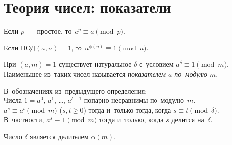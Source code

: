\section*{Теория чисел: показатели}



\begingroup\providecommand\ifincludesolutions{\iffalse}

\ifincludesolutions
\subsection*{Версия с решениями}
\fi

Если $p$~— простое, то~$a^p \equiv a \pmod{p}$.

Если $\text{НОД}(a, n) = 1$, то~$a^{\mathrm{\phi}(n)} \equiv 1 \pmod{n}$.

При $(a, m) = 1$ существует натуральное $\delta$ с~условием
$a^{\delta} \equiv 1 \pmod{m}$.
Наименьшее из~таких чисел называется \emph{показателем $a$ по~модулю $m$}.

\begin{problems}

\item
В~обозначениях из~предыдущего определения:
\\
\subproblem
Числа $1 = a^0$, $a^1$, \ldots, $a^{\delta-1}$ попарно несравнимы
по~модулю~$m$.
\\
\subproblem
$a^s \equiv a^t \pmod{m}$ ($s, t \geq 0$)
тогда и~только тогда, когда
$s \equiv t \pmod{\delta}$.
В~частности, $a^s \equiv 1 \pmod{m}$
тогда и~только, когда
$s$ делится на~$\delta$.
\\
\subproblem
\ifincludesolutions\label{extra/algebra:phi:problem}\fi
Число $\delta$ является делителем $\mathrm{\phi}(m)$.

\end{problems}

\ifincludesolutions
\setcounter{jeolmsubproblem}{0}%
\subproblem
Пусть $a^s \equiv a^t \pmod{m}$.
Тогда $a^{t} (a^{s-t} - 1)$ делится на~$m$.
То есть $(a^{s-t} - 1)$ делится на~$m$.
Но~такого быть не~может, поскольку $0 < s - t < \delta$.
\par
\subproblem
Сначала докажем, что $a^s \equiv 1 \pmod{m}$ тогда и только тогда, когда
$s$ делится на~$\delta$.
Пусть это не~так.
Тогда $s = x \delta + r$.
Имеем, $1 \equiv a^s \equiv (a^{\delta})^x a^r \equiv a^r \pmod{m}$.
Но~такого быть не~может из~определения показателя.
Значит, $r = 0$ и~$s$ делится на~$\delta$ без остатка.
Отсюда сразу следует, что если $a^s \equiv a^t \pmod{m}$, то~$(a^{s-t} - 1)$
делится на~$m$, то~есть $(s - t)$ делится на~$\delta$.
\par
\subproblem
Очевидное следствие из~теоремы Эйлера и~предыдущего пункта.
\fi %

